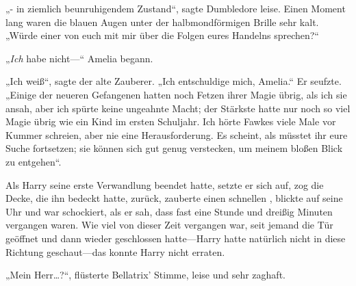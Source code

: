 „- in ziemlich beunruhigendem Zustand“, sagte Dumbledore leise. Einen Moment lang waren die blauen Augen unter der halbmondförmigen Brille sehr kalt. „Würde einer von euch mit mir über die Folgen eures Handelns sprechen?“

„\emph{Ich} habe nicht—“ Amelia begann.

„Ich weiß“, sagte der alte Zauberer. „Ich entschuldige mich, Amelia.“ Er seufzte. „Einige der neueren Gefangenen hatten noch Fetzen ihrer Magie übrig, als ich sie ansah, aber ich spürte keine ungeahnte Macht; der Stärkste hatte nur noch so viel Magie übrig wie ein Kind im ersten Schuljahr. Ich hörte Fawkes viele Male vor Kummer schreien, aber nie eine Herausforderung. Es scheint, als müsstet ihr eure Suche fortsetzen; sie können sich gut genug verstecken, um meinem bloßen Blick zu entgehen“.

\later

Als Harry seine erste Verwandlung beendet hatte, setzte er sich auf, zog die Decke, die ihn bedeckt hatte, zurück, zauberte einen schnellen , blickte auf seine Uhr und war schockiert, als er sah, dass fast eine Stunde und dreißig Minuten vergangen waren. Wie viel von dieser Zeit vergangen war, seit jemand die Tür geöffnet und dann wieder geschlossen hatte—Harry hatte natürlich nicht in diese Richtung geschaut—das konnte Harry nicht erraten.

„Mein Herr…?“, flüsterte Bellatrix' Stimme, leise und sehr zaghaft.

